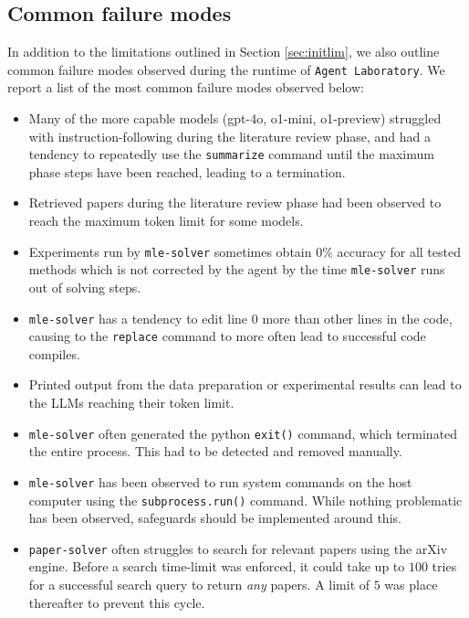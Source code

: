 \documentclass[11pt, a4paper]{gdm_format}
\begin{document}
\subsection{Common failure modes}
\label{sec:failuremodes}

In addition to the limitations outlined in Section \ref{sec:initlim}, we also outline common failure modes observed during the runtime of \texttt{Agent Laboratory}. We report a list of the most common failure modes observed below:

\begin{itemize}
    \item Many of the more capable models (gpt-4o, o1-mini, o1-preview) struggled with instruction-following during the literature review phase, and had a tendency to repeatedly use the \texttt{summarize} command until the maximum phase steps have been reached, leading to a termination.
    \item Retrieved papers during the literature review phase had been observed to reach the maximum token limit for some models.
    \item Experiments run by \texttt{mle-solver} sometimes obtain $0\%$ accuracy for all tested methods which is not corrected by the agent by the time \texttt{mle-solver} runs out of solving steps.
    \item \texttt{mle-solver} has a tendency to edit line $0$ more than other lines in the code, causing to the \texttt{replace} command to more often lead to successful code compiles.
    \item Printed output from the data preparation or experimental results can lead to the LLMs reaching their token limit.
    \item \texttt{mle-solver} often generated the python \lstinline{exit()} command, which terminated the entire process. This had to be detected and removed manually.
    \item \texttt{mle-solver} has been observed to run system commands on the host computer using the \lstinline{subprocess.run()} command. While nothing problematic has been observed, safeguards should be implemented around this.
    \item \texttt{paper-solver} often struggles to search for relevant papers using the arXiv engine. Before a search time-limit was enforced, it could take up to $100$ tries for a successful search query to return \textit{any} papers. A limit of $5$ was place thereafter to prevent this cycle.
\end{itemize}
\end{document}
